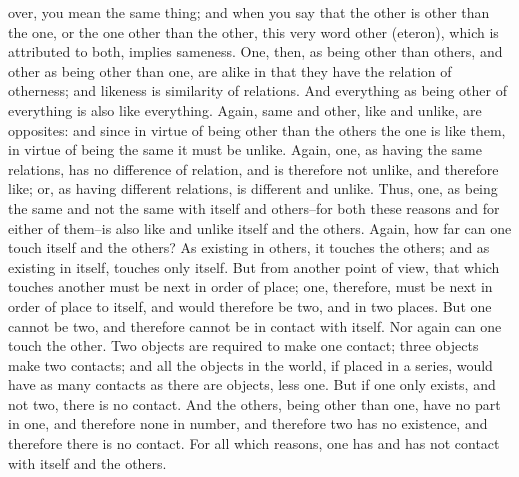 over, you mean the same thing; and when you say that the other is other
than the one, or the one other than the other, this very word other
(eteron), which is attributed to both, implies sameness. One, then, as
being other than others, and other as being other than one, are alike in
that they have the relation of otherness; and likeness is similarity
of relations. And everything as being other of everything is also like
everything. Again, same and other, like and unlike, are opposites: and
since in virtue of being other than the others the one is like them, in
virtue of being the same it must be unlike. Again, one, as having the
same relations, has no difference of relation, and is therefore not
unlike, and therefore like; or, as having different relations, is
different and unlike. Thus, one, as being the same and not the same with
itself and others--for both these reasons and for either of them--is
also like and unlike itself and the others. Again, how far can one touch
itself and the others? As existing in others, it touches the others; and
as existing in itself, touches only itself. But from another point of
view, that which touches another must be next in order of place; one,
therefore, must be next in order of place to itself, and would therefore
be two, and in two places. But one cannot be two, and therefore cannot
be in contact with itself. Nor again can one touch the other. Two
objects are required to make one contact; three objects make two
contacts; and all the objects in the world, if placed in a series, would
have as many contacts as there are objects, less one. But if one only
exists, and not two, there is no contact. And the others, being other
than one, have no part in one, and therefore none in number, and
therefore two has no existence, and therefore there is no contact.
For all which reasons, one has and has not contact with itself and the
others.

